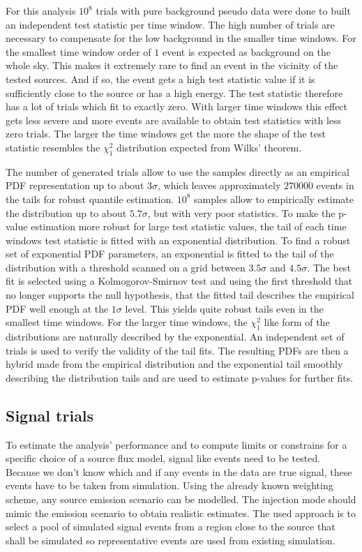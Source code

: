 For this analysis $10^8$ trials with pure background pseudo data were done to built an independent test statistic per time window.
The high number of trials are necessary to compensate for the low background in the smaller time windows.
For the smallest time window order of $1$ event is expected as background on the whole sky.
This makes it extremely rare to find an event in the vicinity of the tested sources.
And if so, the event gets a high test statistic value if it is sufficiently close to the source or has a high energy.
The test statistic therefore has a lot of trials which fit to exactly zero.
With larger time windows this effect gets less severe and more events are available to obtain test statistics with less zero trials.
The larger the time windows get the more the shape of the test statistic resembles the $\chi^2_1$ distribution expected from Wilks' theorem.

The number of generated trials allow to use the samples directly as an empirical PDF representation up to about $3\sigma$, which leaves approximately $\num{270000}$ events in the tails for robust quantile estimation.
$10^8$ samples allow to empirically estimate the distribution up to about $5.7\sigma$, but with very poor statistics.
To make the p-value estimation more robust for large test statistic values, the tail of each time windows test statistic is fitted with an exponential distribution.
To find a robust set of exponential PDF parameters, an exponential is fitted to the tail of the distribution with a threshold scanned on a grid between $3.5\sigma$ and $4.5\sigma$.
The best fit is selected using a Kolmogorov-Smirnov test  and using the first threshold that no longer supports the null hypothesis, that the fitted tail describes the empirical PDF well enough at the $1\sigma$ level.
This yields quite robust tails even in the smallest time windows.
For the larger time windows, the $\chi^2_1$ like form of the distributions are naturally described by the exponential.
An independent set of trials is used to verify the validity of the tail fits.
The resulting PDFs are then a hybrid made from the empirical distribution and the exponential tail smoothly describing the distribution tails and are used to estimate p-values for further fits.

\subsection*{Signal trials}
To estimate the analysis' performance and to compute limits or constrains for a specific choice of a source flux model, signal like events need to be tested.
Because we don't know which and if any events in the data are true signal, these events have to be taken from simulation.
Using the already known weighting scheme, any source emission scenario can be modelled.
The injection mode should mimic the emission scenario to obtain realistic estimates.
The used approach is to select a pool of simulated signal events from a region close to the source that shall be simulated so representative events are used from existing simulation.


